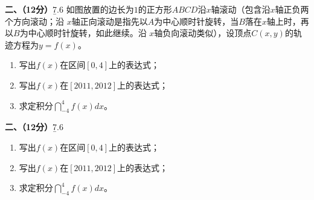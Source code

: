 \begin{frame}
	\linespread{1.3}
	\begin{exampleblock}{{\bf 二、（12分）}\hfill{\b 7.6}}
		 如图放置的边长为$1$的正方形$ABCD$沿$x$轴滚动（包含沿$x$轴正负两个方向滚动；沿
		$x$轴正向滚动是指先以$A$为中心顺时针旋转，当$B$落在$x$轴上时，再以$B$为中心顺时针旋转，如此继续。沿
		$x$轴负向滚动类似），设顶点$C(x,y)$的轨迹方程为$y=f(x)$。\pause
		\begin{enumerate}
		  \item 写出$f(x)$在区间$[0,4]$上的表达式；\pause
		  \item 写出$f(x)$在$[2011,2012]$上的表达式；\pause
		  \item 求定积分$\dint_{-4}^4f(x)dx$。
		\end{enumerate}
	\end{exampleblock}
\end{frame}

\begin{frame}
	\linespread{1.2}
	\begin{exampleblock}{{\bf 二、（12分）}\hfill{\b 7.6}}
		\begin{enumerate}
		  \item 写出$f(x)$在区间$[0,4]$上的表达式；
		  \item 写出$f(x)$在$[2011,2012]$上的表达式；
		  \item 求定积分$\dint_{-4}^4f(x)dx$。
		\end{enumerate}
	\end{exampleblock}\pause
	\begin{center}
	\end{center}
\end{frame}

